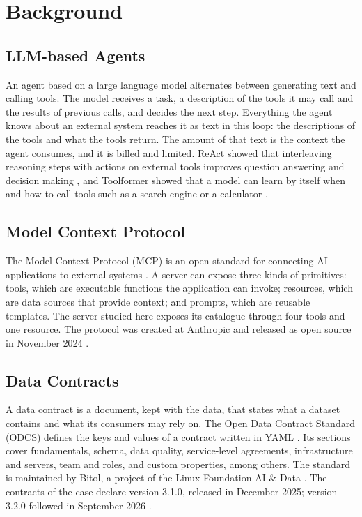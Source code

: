 \chapter{Background}

\section{LLM-based Agents}
An agent based on a large language model alternates between generating text and calling
tools. The model receives a task, a description of the tools it may call and the results of
previous calls, and decides the next step. Everything the agent knows about an external
system reaches it as text in this loop: the descriptions of the tools and what the tools
return. The amount of that text is the context the agent consumes, and it is billed and
limited. ReAct showed that interleaving reasoning steps with actions on external tools
improves question answering and decision making \cite{yao2022react}, and Toolformer showed
that a model can learn by itself when and how to call tools such as a search engine or a
calculator \cite{schick2023toolformer}.

\section{Model Context Protocol}
The Model Context Protocol (MCP) is an open standard for connecting AI applications to
external systems \cite{mcp2026intro}. A server can expose three kinds of primitives: tools,
which are executable functions the application can invoke; resources, which are data sources
that provide context; and prompts, which are reusable templates. The server studied here
exposes its catalogue through four tools and one resource. The protocol was created at
Anthropic and released as open source in November 2024 \cite{anthropic2024mcp}.

\section{Data Contracts}
A data contract is a document, kept with the data, that states what a dataset contains and
what its consumers may rely on. The Open Data Contract Standard (ODCS) defines the keys and
values of a contract written in YAML \cite{odcs2026}. Its sections cover fundamentals,
schema, data quality, service-level agreements, infrastructure and servers, team and roles,
and custom properties, among others. The standard is maintained by Bitol, a project of the
Linux Foundation AI \& Data \cite{bitol2026}. The contracts of the case declare version
3.1.0, released in December 2025; version 3.2.0 followed in September 2026
\cite{odcsreleases2026}.

